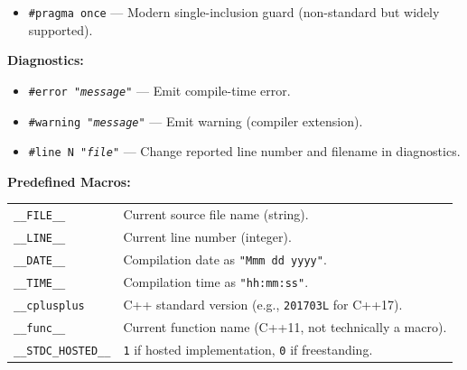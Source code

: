 \begin{minipage}{\linewidth}
\begin{itemize}
    Example header guard:
    \begin{verbatim}
    #ifndef HEADER_FILE_H
    #define HEADER_FILE_H
    // ... declarations ...
    #endif
    \end{verbatim}

    \item \texttt{\#pragma once} --- Modern single-inclusion guard (non-standard but widely supported).
\end{itemize}

\textbf{Diagnostics:}
\begin{itemize}
    \setlength{\itemsep}{-0.5em}
    \item \texttt{\#error "\textit{message}"} --- Emit compile-time error.
    \item \texttt{\#warning "\textit{message}"} --- Emit warning (compiler extension).
    \item \texttt{\#line N "\textit{file}"} --- Change reported line number and filename in diagnostics.
\end{itemize}

\textbf{Predefined Macros:}

\vspace{0.3em}
\begin{tabularx}{\linewidth}{lX}
\verb|__FILE__|         & Current source file name (string). \\
\verb|__LINE__|         & Current line number (integer). \\
\verb|__DATE__|         & Compilation date as \texttt{"Mmm dd yyyy"}. \\
\verb|__TIME__|         & Compilation time as \texttt{"hh:mm:ss"}. \\
\verb|__cplusplus|      & C++ standard version (e.g., \texttt{201703L} for C++17). \\
\verb|__func__|         & Current function name (C++11, not technically a macro). \\
\verb|__STDC_HOSTED__| & \texttt{1} if hosted implementation, \texttt{0} if freestanding.
\end{tabularx}

\end{minipage}